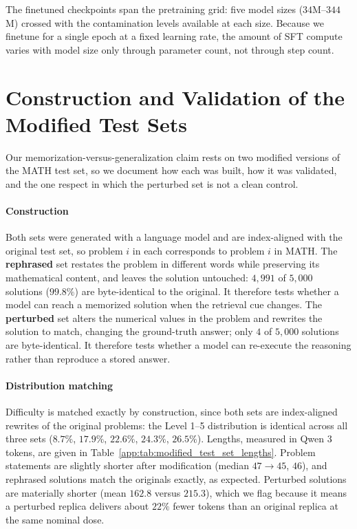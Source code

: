The finetuned checkpoints span the pretraining grid: five model sizes ($34$M--$344$M) crossed with the contamination levels available at each size.
Because we finetune for a single epoch at a fixed learning rate, the amount of SFT compute varies with model size only through parameter count, not through step count.

\section{Construction and Validation of the Modified Test Sets}
\label{app:sec:modified_test_set_validation}

Our memorization-versus-generalization claim rests on two modified versions of the MATH test set, so we document how each was built, how it was validated, and the one respect in which the perturbed set is not a clean control.

\paragraph{Construction}
Both sets were generated with a language model and are index-aligned with the original test set, so problem $i$ in each corresponds to problem $i$ in MATH.
The \textbf{rephrased} set restates the problem in different words while preserving its mathematical content, and leaves the solution untouched: $4{,}991$ of $5{,}000$ solutions ($99.8\%$) are byte-identical to the original.
It therefore tests whether a model can reach a memorized solution when the retrieval cue changes.
The \textbf{perturbed} set alters the numerical values in the problem and rewrites the solution to match, changing the ground-truth answer; only $4$ of $5{,}000$ solutions are byte-identical.
It therefore tests whether a model can re-execute the reasoning rather than reproduce a stored answer.

\paragraph{Distribution matching}
Difficulty is matched exactly by construction, since both sets are index-aligned rewrites of the original problems: the Level 1--5 distribution is identical across all three sets ($8.7\%$, $17.9\%$, $22.6\%$, $24.3\%$, $26.5\%$).
Lengths, measured in Qwen 3 tokens, are given in Table~\ref{app:tab:modified_test_set_lengths}.
Problem statements are slightly shorter after modification (median $47 \rightarrow 45$, $46$), and rephrased solutions match the originals exactly, as expected.
Perturbed solutions are materially shorter (mean $162.8$ versus $215.3$), which we flag because it means a perturbed replica delivers about $22\%$ fewer tokens than an original replica at the same nominal dose.

